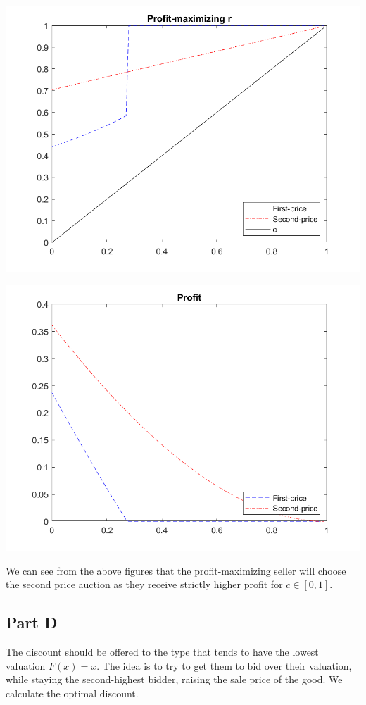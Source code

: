 \documentclass[11pt]{article} %
\begin{document}
\includegraphics{argmax}

\includegraphics{profit}

We can see from the above figures that the profit-maximizing seller will choose the second price auction as they receive strictly higher profit for $c\in [0,1]$.

\subsection{Part D}
The discount should be offered to the type that tends to have the lowest valuation $F(x) = x$. The idea is to try to get them to bid over their valuation, while staying the second-highest bidder, raising the sale price of the good. We calculate the optimal discount.
\end{document}
